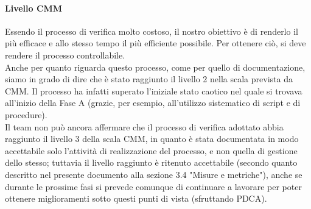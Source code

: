 \documentclass[../PianoDiQualifica.tex]{subfiles}
\begin{document}
\begin{appendices}
			\paragraph{Livello CMM}
			Essendo il processo di verifica molto costoso, il nostro obiettivo è di renderlo il più efficace e allo stesso tempo il più efficiente possibile. Per ottenere ciò, si deve rendere il processo controllabile. \\
			Anche per quanto riguarda questo processo, come per quello di documentazione, siamo in grado di dire che è stato raggiunto il livello 2 nella scala prevista da CMM. Il processo ha infatti superato l'iniziale stato caotico nel quale si trovava all'inizio della Fase A (grazie, per esempio, all'utilizzo sistematico di script e di procedure). \\
			Il team non può ancora affermare che il processo di verifica adottato abbia raggiunto il livello 3 della scala CMM, in quanto è stata documentata in modo accettabile solo l'attività di realizzazione del processo, e non quella di gestione dello stesso; tuttavia il livello raggiunto è ritenuto accettabile (secondo quanto descritto nel presente documento alla sezione 3.4 "Misure e metriche"), anche se durante le prossime fasi si prevede comunque di continuare a lavorare per poter ottenere miglioramenti sotto questi punti di vista (sfruttando PDCA).
\end{appendices}
\end{document}
